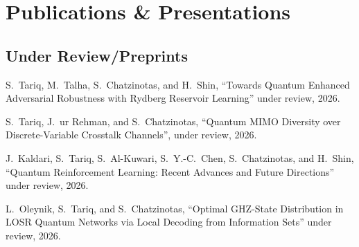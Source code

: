 \documentclass[10pt]{article}
\begin{document}
\section*{Publications \& Presentations}












\subsection*{Under Review/Preprints}	
\begin{enumerate}[ {[}1{]} ]
\item S.~Tariq, M.~Talha, S.~Chatzinotas, and H.~Shin, “Towards Quantum Enhanced Adversarial Robustness with Rydberg Reservoir Learning'' under review, 2026.  
\item S.~Tariq, J.~ur Rehman, and S.~Chatzinotas, “Quantum MIMO Diversity over Discrete-Variable Crosstalk Channels'', under review, 2026. 

\item J.~Kaldari, S.~Tariq, S.~Al-Kuwari, S.~Y.-C.~Chen, S.~Chatzinotas, and H.~Shin, “Quantum Reinforcement Learning: Recent Advances and Future Directions'' under review, 2026.

\item L.~Oleynik, S.~Tariq, and S.~Chatzinotas, “Optimal GHZ-State Distribution in LOSR Quantum Networks via Local Decoding from Information Sets'' under review, 2026.

\end{enumerate}
\end{document}

